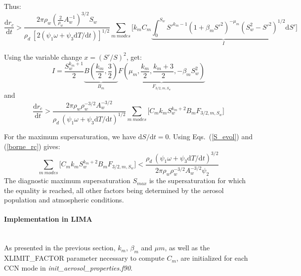 Thus:
\begin{equation}
 \frac{\mathrm{d}r_c}{\mathrm{d}t} > \frac{2 \pi \rho_w \left(\frac{2}{\rho_w} A_w^{-1}\right)^{3/2} S_w}{\rho_d ~ [2(\psi_1 \omega + \psi_3 \mathrm{d}T/\mathrm{d}t)]^{1/2}} \sum_{m~modes} \bigg[ k_m C_m \underbrace{\int_0^{S_w}  S'^{k_m-1} (1+\beta_m S'^2)^{-\mu_m} (S_w^2-S'^2)^{1/2} \mathrm{d}S'}_{I} \bigg]
\end{equation}

Using the variable change $x=(S'/S)^2$, \citet{Cohard1998} get:
\begin{equation}
 I = \frac{S_w^{k_m+1}}{2} \underbrace{B\left(\frac{k_m}{2},\frac{3}{2}\right)}_{B_m} \underbrace{F\left(\mu_m,\frac{k_m}{2},\frac{k_m+3}{2},-\beta_mS_w^2\right)}_{F_{3/2,m,S_w}}
\end{equation}
and
\begin{equation}
  \label{borne_rc}
 \frac{\mathrm{d}r_c}{\mathrm{d}t} > \frac{2 \pi \rho_w \rho_w^{-3/2} A_w^{-3/2} }{\rho_d ~ (\psi_1 \omega + \psi_3 \mathrm{d}T/\mathrm{d}t)^{1/2}} \sum_{m~modes} \bigg[ C_m k_m S_w^{k_m+2} B_m F_{3/2,m,S_w} \bigg]
\end{equation}

For the maximum supersaturation, we have $\mathrm{d}S/\mathrm{d}t=0$. Using Eqs.\ (\ref{S_evol}) and (\ref{borne_rc}) gives:
\begin{equation}
 \label{eq-smax}
 \sum_{m~modes} \bigg[ C_m k_m S_w^{k_m+2} B_m F_{3/2,m,S_w} \bigg] < \frac{\rho_d ~ (\psi_1 \omega + \psi_3 \mathrm{d}T/\mathrm{d}t)^{3/2}}{2 \pi \rho_w \rho_w^{-3/2} A_w^{-3/2} \psi_2}
\end{equation}
The diagnostic maximum supersaturation $S_{max}$ is the supersaturation for which the equality is reached, all other factors being determined by the aerosol population and atmospheric conditions.


\paragraph{Implementation in LIMA}
~\\
As presented in the previous section, $k_m$, $\beta_m$ and $\mu m$, as well as the XLIMIT\_FACTOR parameter necessary to compute $C_m$, are initialized for each CCN mode in \emph{init\_aerosol\_properties.f90}. 

~\newline

